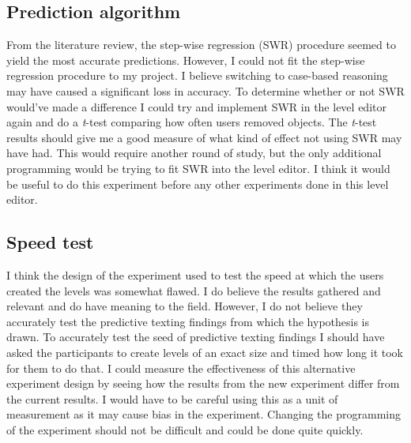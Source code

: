 \documentclass[journal]{IEEEtran}
\begin{document}
\subsection{Prediction algorithm}
From the literature review, the step-wise regression (SWR) procedure seemed to yield the most accurate predictions. However, I could not fit the step-wise regression procedure to my project. I believe switching to case-based reasoning may have caused a significant loss in accuracy. To determine whether or not SWR would've made a difference I could try and implement SWR in the level editor again and do a \textit{t}-test comparing how often users removed objects. The \textit{t}-test results should give me a good measure of what kind of effect not using SWR may have had. This would require another round of study, but the only additional programming would be trying to fit SWR into the level editor. I think it would be useful to do this experiment before any other experiments done in this level editor.

\subsection{Speed test}
I think the design of the experiment used to test the speed at which the users created the levels was somewhat flawed. I do believe the results gathered and relevant and do have meaning to the field. However,  I do not believe they accurately test the predictive texting findings from which the hypothesis is drawn. To accurately test the seed of predictive texting findings I should have asked the participants to create levels of an exact size and timed how long it took for them to do that. I could measure the effectiveness of this alternative experiment design by seeing how the results from the new experiment differ from the current results. I would have to be careful using this as a unit of measurement as it may cause bias in the experiment. Changing the programming of the experiment should not be difficult and could be done quite quickly.
\end{document}
